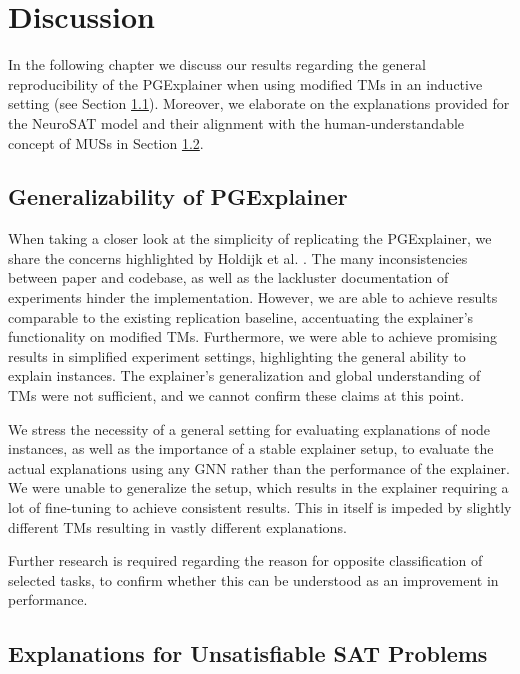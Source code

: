\chapter{Discussion}

In the following chapter we discuss our results regarding the general reproducibility of the PGExplainer \cite{luo2020parameterized} when using modified \acp{TM} in an inductive setting (see Section \ref{sec:discuss_pge}). Moreover, we elaborate on the explanations provided for the NeuroSAT \cite{selsam2018learning} model and their alignment with the human-understandable concept of \acp{MUS} in Section \ref{sec:discuss_sat}.


\section{Generalizability of PGExplainer}
\label{sec:discuss_pge}
When taking a closer look at the simplicity of replicating the PGExplainer, we share the concerns highlighted by Holdijk et al. \cite{holdijk2021re}. The many inconsistencies between paper and codebase, as well as the lackluster documentation of experiments hinder the implementation. However, we are able to achieve results comparable to the existing replication baseline, accentuating the explainer's functionality on modified \acp{TM}. Furthermore, we were able to achieve promising results in simplified experiment settings, highlighting the general ability to explain instances. The explainer's generalization and global understanding of \acp{TM} were not sufficient, and we cannot confirm these claims at this point.

We stress the necessity of a general setting for evaluating explanations of node instances, as well as the importance of a stable explainer setup, to evaluate the actual explanations using any GNN rather than the performance of the explainer. We were unable to generalize the setup, which results in the explainer requiring a lot of fine-tuning to achieve consistent results. This in itself is impeded by slightly different \acp{TM} resulting in vastly different explanations.

Further research is required regarding the reason for opposite classification of selected tasks, to confirm whether this can be understood as an improvement in performance.

\section{Explanations for Unsatisfiable SAT Problems}
\label{sec:discuss_sat}

